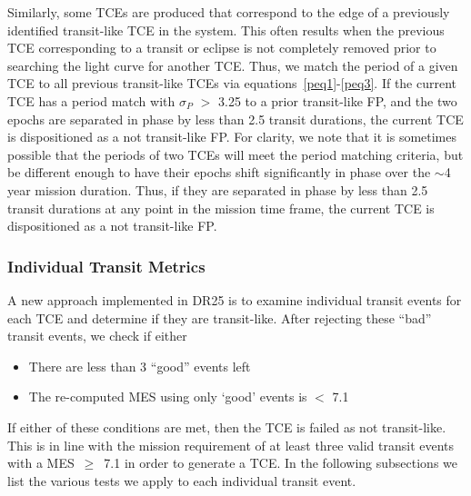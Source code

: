 Similarly, some TCEs are produced that correspond to the edge of a previously identified transit-like TCE in the system. This often results when the previous TCE corresponding to a transit or eclipse is not completely removed prior to searching the light curve for another TCE. Thus, we match the period of a given TCE to all previous transit-like TCEs via equations~\ref{peq1}-\ref{peq3}.  If the current TCE has a period match with $\sigma_{P}$ $>$ 3.25 to a prior transit-like FP, and the two epochs are separated in phase by less than 2.5 transit durations, the current TCE is dispositioned as a not transit-like FP. For clarity, we note that it is sometimes possible that the periods of two TCEs will meet the period matching criteria, but be different enough to have their epochs shift significantly in phase over the $\sim$4 year mission duration. Thus, if they are separated in phase by less than 2.5 transit durations at any point in the mission time frame, the current TCE is dispositioned as a not transit-like FP.



\subsubsection{Individual Transit Metrics}
\label{s:indivtrans}
A new approach implemented in DR25 is to examine individual transit events for each TCE and determine if they are transit-like. After rejecting these ``bad'' transit events, we check if either

\begin{itemize}
\item There are less than 3 ``good'' events left
\item The re-computed MES using only `good' events is $<$ 7.1
\end{itemize}

\noindent If either of these conditions are met, then the TCE is failed as not transit-like. This is in line with the \kepler{} mission requirement of at least three valid transit events with a MES~$\ge$~7.1 in order to generate a TCE. In the following subsections we list the various tests we apply to each individual transit event.


